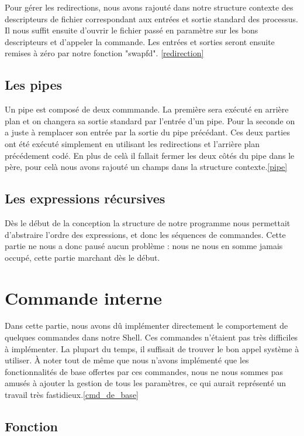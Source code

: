 \documentclass[12pt]{article}
\begin{document}
Pour gérer les redirections, nous avons rajouté dans notre structure contexte des descripteurs
de fichier correspondant aux entrées et sortie standard des processus. Il nous suffit ensuite 
d'ouvrir le fichier passé en paramètre sur les bons descripteurs et d'appeler la commande.
Les entrées et sorties seront ensuite remises à zéro par notre fonction "swapfd". \ref{redirection}

\subsection{Les pipes}

Un pipe est composé de deux commmande. La première sera exécuté en arrière plan et on changera
sa sortie standard par l'entrée d'un pipe. Pour la seconde on a juste à remplacer son entrée par
la sortie du pipe précédant. Ces deux parties ont été exécuté simplement en utilisant les
redirections et l'arrière plan précédement codé. En plus de celà il fallait fermer les deux
côtés du pipe dans le père, pour celà nous avons rajouté un champs dans la structure contexte.\ref{pipe}


\subsection{Les expressions récursives}

Dès le début de la conception la structure de notre programme nous permettait d'abstraire l'ordre
des expressions, et donc les séquences de commandes. Cette partie ne nous a donc pausé aucun problème :
nous ne nous en somme jamais occupé, cette partie marchant dès le début.


\newpage
\section{Commande interne}

Dans cette partie, nous avons dû implémenter directement le comportement de quelques
commandes dans notre Shell. Ces commandes n'étaient pas très difficiles à implémenter. La plupart
du temps, il suffisait de trouver le bon appel système à utiliser. À noter tout de même
que nous n'avons implémenté que les fonctionnalités de base offertes par ces commandes, nous
ne nous sommes pas amusés à ajouter la gestion de tous les paramètres, ce qui aurait 
représenté un travail très fastidieux.\ref{cmd_de_base}

\subsection{Fonction}
\end{document}
